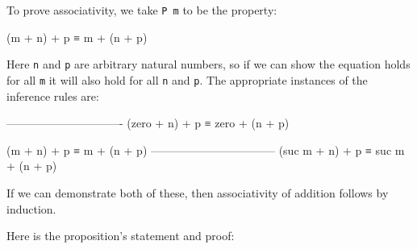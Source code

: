 To prove associativity, we take \texttt{P\ m} to be the property:

\begin{myDisplay}
(m + n) + p ≡ m + (n + p)
\end{myDisplay}

Here \texttt{n} and \texttt{p} are arbitrary natural numbers, so if we
can show the equation holds for all \texttt{m} it will also hold for all
\texttt{n} and \texttt{p}. The appropriate instances of the inference
rules are:

\begin{myDisplay}
-------------------------------
(zero + n) + p ≡ zero + (n + p)

(m + n) + p ≡ m + (n + p)
---------------------------------
(suc m + n) + p ≡ suc m + (n + p)
\end{myDisplay}

If we can demonstrate both of these, then associativity of addition
follows by induction.

Here is the proposition's statement and proof:

